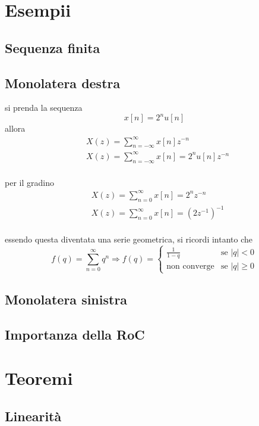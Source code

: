\documentclass[11pt]{article}
\begin{document}
\section{Esempii}
\label{sec:orgf9d06fe}

\subsection{Sequenza finita}
\label{sec:orgb663558}
\subsection{Monolatera destra}
\label{sec:org16c3ed6}
si prenda la sequenza
\[
x[n] = 2^n u[n]
\]
allora
\begin{align*}
& X(z) = \sum_{n=-\infty}^{\infty} x[n] z^{-n} \\
& X(z) = \sum_{n=-\infty}^{\infty} x[n] = 2^n u[n] z^{-n} \\
\end{align*}

per il gradino
\begin{align*}
& X(z) = \sum_{n=0}^{\infty} x[n] = 2^n z^{-n} \\
& X(z) = \sum_{n=0}^{\infty} x[n] = (2z^{-1})^{-1} \\
\end{align*}

essendo questa diventata una serie geometrica, si ricordi intanto che
\[
f(q) = \sum_{n=0}^{\infty} q^n \Rightarrow
f(q) = \begin{cases}
\frac{1}{1-q} & \text{se } \lvert q \rvert < 0 \\
\text{non converge} & \text{se } \lvert q \rvert \geq 0
\end{cases}
\]

\subsection{Monolatera sinistra}
\label{sec:org1042e7d}

\subsection{Importanza della RoC}
\label{sec:org08327c5}
\section{Teoremi}
\label{sec:org857a110}
\subsection{Linearità}
\label{sec:orgd28098e}
\end{document}
